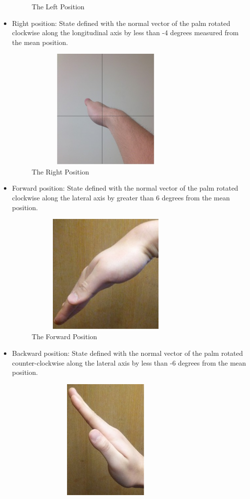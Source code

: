 \documentclass[letterpaper,english, 12pt]{article}
\begin{document}
\begin{itemize}
\begin{figure}[H]
			\caption{The Left Position}
		\end{figure}
		\item Right position: State defined with the normal vector of the palm rotated clockwise along the longitudinal axis by less than -4 degrees measured from the mean position. \\
		\begin{figure}[H]
			\centering
			\includegraphics[height=6cm, width=80mm]{pics/right.jpg} 
			\caption{The Right Position}
		\end{figure}
		\item Forward position: State defined with the normal vector of the palm rotated clockwise along the lateral axis by greater than 6 degrees from the mean position. \\
		\begin{figure}[H]
	 		\centering
			\includegraphics[height=6cm, width=80mm]{pics/forward.jpg} 
			\caption{The Forward Position}
		\end{figure}
		\item Backward position: State defined with the normal vector of the palm rotated counter-clockwise along the lateral axis by less than -6 degrees from the mean position.  \\
		\begin{figure}[H]
	 		\centering
			\includegraphics[height=6cm, width=80mm]{pics/backward.jpg} 

\end{figure}
\end{itemize}
\end{document}

